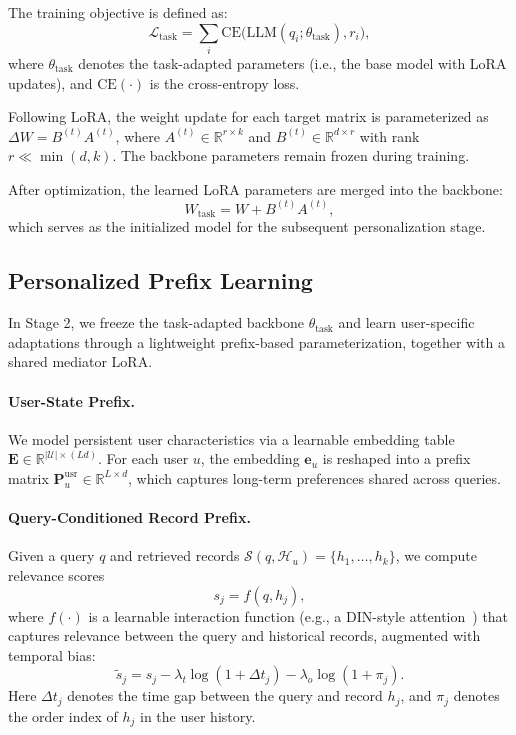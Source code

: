 \documentclass[11pt]{article}
\begin{document}
The training objective is defined as:
\begin{equation}
    \mathcal{L}_{\text{task}} = \sum_i \mathrm{CE}\big(\mathrm{LLM}(q_i; \theta_{\text{task}}), r_i \big),
\end{equation}
where $\theta_{\text{task}}$ denotes the task-adapted parameters (i.e., the base model with LoRA updates), and $\mathrm{CE}(\cdot)$ is the cross-entropy loss.

Following LoRA, the weight update for each target matrix is parameterized as $\Delta W = B^{(t)} A^{(t)}$, where $A^{(t)} \in \mathbb{R}^{r \times k}$ and $B^{(t)} \in \mathbb{R}^{d \times r}$ with rank $r \ll \min(d, k)$. The backbone parameters remain frozen during training.

After optimization, the learned LoRA parameters are merged into the backbone:
\begin{equation}
    W_{\text{task}} = W + B^{(t)} A^{(t)},
\end{equation}
which serves as the initialized model for the subsequent personalization stage.





\subsection{Personalized Prefix Learning}

\setcounter{equation}{2}

In Stage 2, we freeze the task-adapted backbone $\theta_{\text{task}}$ and learn user-specific adaptations through a lightweight prefix-based parameterization, together with a shared mediator LoRA.

\paragraph{User-State Prefix.}
We model persistent user characteristics via a learnable embedding table $\mathbf{E} \in \mathbb{R}^{|\mathcal{U}|\times (L d)}$. 
For each user $u$, the embedding $\mathbf{e}_u$ is reshaped into a prefix matrix $\mathbf{P}_u^{\text{usr}} \in \mathbb{R}^{L\times d}$, which captures long-term preferences shared across queries.

\paragraph{Query-Conditioned Record Prefix.}
Given a query $q$ and retrieved records $\mathcal{S}(q,\mathcal{H}_u)=\{h_1,\dots,h_k\}$, we compute relevance scores
\begin{equation}
s_j = f(q, h_j),
\end{equation}
where $f(\cdot)$ is a learnable interaction function (e.g., a DIN-style attention~\cite{zhou2018deep}) that captures relevance between the query and historical records, augmented with temporal bias:
\begin{equation}
\tilde{s}_j = s_j - \lambda_t \log(1+\Delta t_j) - \lambda_o \log(1+\pi_j).
\end{equation}
Here $\Delta t_j$ denotes the time gap between the query and record $h_j$, and $\pi_j$ denotes the order index of $h_j$ in the user history.
\end{document}
